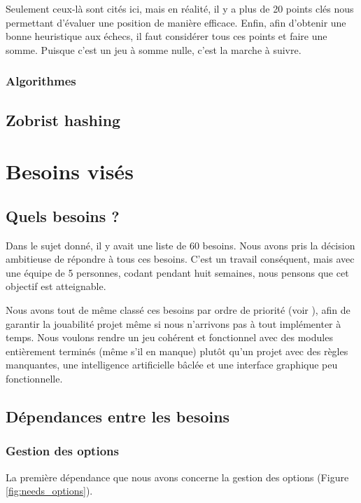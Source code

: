 \documentclass{article}
\begin{document}
Seulement ceux-là sont cités ici, mais en réalité, il y a plus de 20 points clés nous permettant d'évaluer une position de manière efficace.
Enfin, afin d'obtenir une bonne heuristique aux échecs, il faut considérer tous ces points et faire une somme. Puisque c'est un jeu à somme nulle,
c'est la marche à suivre. 

\subsubsection{Algorithmes}

\subsection{Zobrist hashing}

\section{Besoins visés}
\subsection{Quels besoins ?}
Dans le sujet donné, il y avait une liste de 60 besoins.
Nous avons pris la décision ambitieuse de répondre à tous ces besoins. C'est un travail conséquent,
mais avec une équipe de 5 personnes, codant pendant huit semaines,
nous pensons que cet objectif est atteignable.

Nous avons tout de même classé ces besoins par ordre de priorité (voir ), afin de garantir
la jouabilité projet même si nous n'arrivons pas à tout implémenter à temps.
Nous voulons rendre un jeu cohérent et fonctionnel avec des modules entièrement
terminés (même s'il en manque) plutôt qu'un projet avec des règles manquantes,
une intelligence artificielle bâclée et une interface graphique peu fonctionnelle.

\subsection{Dépendances entre les besoins}
\subsubsection{Gestion des options}
La première dépendance que nous avons concerne la gestion des options (Figure \ref{fig:needs_options}).
\end{document}
